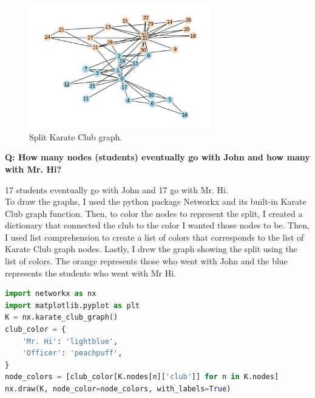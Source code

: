 \documentclass[12pt]{article}
\begin{document}
\begin{figure}[h]
    \centering
    \includegraphics[width=300, scale=0.75]
    {KC_clubs.png}
    \caption{Split Karate Club graph.}
    \label{fig:split_kc}
\end{figure}

\clearpage

\noindent\textbf{Q: How many nodes (students) eventually go with John and how many with Mr. Hi?}

17 students eventually go with John and 17 go with Mr. Hi.\\

To draw the graphs, I used the python package Networkx and its built-in Karate Club graph function. Then, to color the nodes to represent the split, I created a dictionary that connected the club to the color I wanted those nodes to be. Then, I used list comprehension to create a list of colors that corresponds to the list of Karate Club graph nodes. Lastly, I drew the graph showing the split using the list of colors. The orange represents those who went with John and the blue represents the students who went with Mr Hi.

\begin{lstlisting}[language=Python, caption=Drawing the split Karate Club graph, label=lst:copy]
import networkx as nx
import matplotlib.pyplot as plt
K = nx.karate_club_graph()
club_color = {
    'Mr. Hi': 'lightblue',
    'Officer': 'peachpuff',
}
node_colors = [club_color[K.nodes[n]['club']] for n in K.nodes]
nx.draw(K, node_color=node_colors, with_labels=True)
\end{lstlisting}
\end{document}
